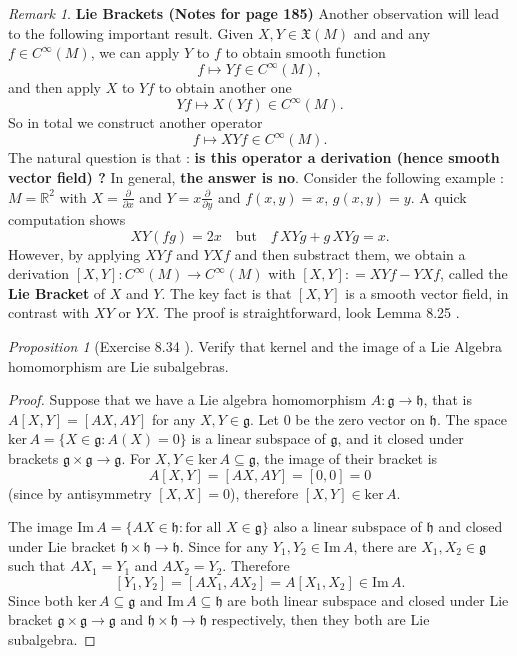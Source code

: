 \documentclass[a4paper]{article}
\theoremstyle{remark}
\newtheorem*{remark}{Remark}
\newtheorem{prop}{Proposition}
\newcommand{\er}{\mathbb{R}} %
\newcommand{\doo}{\partial}    %
\newcommand{\subhim}{\subseteq} %
\newcommand{\CM}{C^{\infty}(M)} %
\newcommand{\VF}{\mathfrak{X}} %
\begin{document}
\begin{remark}
\textbf{Lie Brackets (Notes for page 185)}
Another observation will lead to the following important result.  Given $X,Y \in \VF(M)$ and and any $f \in \CM$, we can apply $Y$ to $f$ to obtain smooth function
$$
f \mapsto Yf \in \CM,
$$ 
and then apply $X$ to $Yf$ to obtain another one 
$$
Yf \mapsto X(Yf) \in \CM.
$$ 
So in total we construct another operator 
$$
f \mapsto XYf \in \CM.
$$ 
The natural question is that : \textbf{is this operator a derivation (hence smooth vector field) ?}  In general, \textbf{the answer is no}. Consider the following example : $M = \er^2$ with $X = \frac{\doo}{\doo x}$ and $Y=x\frac{\doo}{\doo y}$ and $f(x,y) = x$, $g(x,y) = y$. A quick computation shows
$$
XY(fg) = 2x\quad \text{but} \quad  f\,XYg + g\, XYg = x.
$$
However, by applying $XYf$ and $YXf$ and then substract them, we obtain a derivation $[X,Y] : \CM \to \CM$ with $[X,Y] : = XYf - YXf$, called the \textbf{Lie Bracket} of $X$ and $Y$. The key fact is that $[X,Y]$ is a smooth vector field, in contrast with $XY$ or $YX$. The proof is straightforward, look Lemma 8.25 \cite{LeeSM}.
\end{remark}

\begin{prop}[Exercise 8.34 \cite{LeeSM}]
Verify that kernel and the image of a Lie Algebra homomorphism are Lie subalgebras.
\end{prop}
\begin{proof}
Suppose that we have a Lie algebra homomorphism $A : \mathfrak{g} \to \mathfrak{h}$, that is $A[X,Y] = [AX,AY]$ for any $X,Y \in \mathfrak{g}$. Let $0$ be the zero vector on $\mathfrak{h}$. The space $\text{ker}\,A = \{X \in \mathfrak{g} : A(X) = 0 \}$ is a linear subspace of $\mathfrak{g}$, and it closed under brackets $\mathfrak{g} \times \mathfrak{g} \to \mathfrak{g}$. For $X,Y \in \text{ker}\,A \subhim \mathfrak{g}$, the image of their bracket is 
$$
A[X,Y] = [AX,AY] = [0,0] = 0
$$ 
(since by antisymmetry $[X,X] = 0$), therefore $[X,Y] \in \text{ker}\,A$.

The image $\text{Im}\,A =\{AX \in \mathfrak{h} : \text{for all }X \in \mathfrak{g}  \} $ also a linear subspace of $\mathfrak{h}$ and closed under Lie bracket $\mathfrak{h} \times \mathfrak{h} \to \mathfrak{h}$. Since for any $Y_1,Y_2 \in \text{Im}\,A$, there are $X_1,X_2 \in \mathfrak{g}$ such that $AX_1=Y_1$ and $AX_2=Y_2$. Therefore
$$
[Y_1,Y_2] = [AX_1,AX_2] = A[X_1,X_2] \in \text{Im}\, A.
$$
Since both $\text{ker}\, A\subhim \mathfrak{g}$ and $\text{Im}\, A \subhim \mathfrak{h}$ are both linear subspace and closed under Lie bracket $\mathfrak{g} \times \mathfrak{g} \to \mathfrak{g}$ and $\mathfrak{h} \times \mathfrak{h} \to \mathfrak{h}$ respectively, then they both are Lie subalgebra. 
\end{proof}
\end{document}
